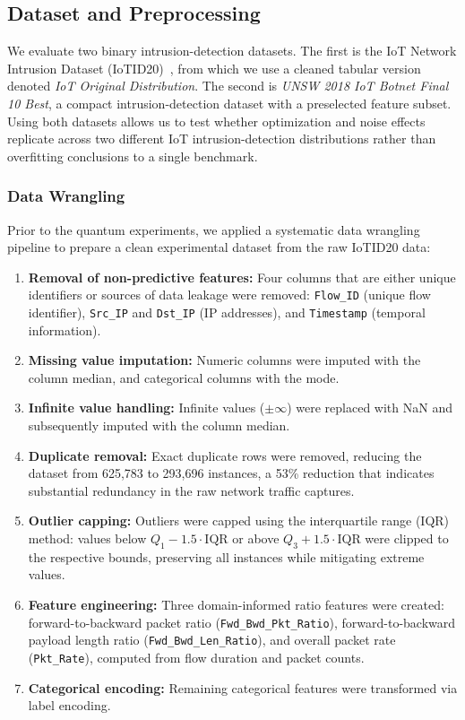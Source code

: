 \documentclass{ieeeaccess}
\begin{document}
\subsection{Dataset and Preprocessing}
\label{sec:dataset}

We evaluate two binary intrusion-detection datasets. The first is the IoT Network Intrusion Dataset (IoTID20)~\cite{ullah2020scheme}, from which we use a cleaned tabular version denoted \emph{IoT Original Distribution}. The second is \emph{UNSW 2018 IoT Botnet Final 10 Best}, a compact intrusion-detection dataset with a preselected feature subset. Using both datasets allows us to test whether optimization and noise effects replicate across two different IoT intrusion-detection distributions rather than overfitting conclusions to a single benchmark.

\subsubsection{Data Wrangling}
Prior to the quantum experiments, we applied a systematic data wrangling pipeline to prepare a clean experimental dataset from the raw IoTID20 data:
\begin{enumerate}
\item \textbf{Removal of non-predictive features:} Four columns that are either unique identifiers or sources of data leakage were removed: \texttt{Flow\_ID} (unique flow identifier), \texttt{Src\_IP} and \texttt{Dst\_IP} (IP addresses), and \texttt{Timestamp} (temporal information).
\item \textbf{Missing value imputation:} Numeric columns were imputed with the column median, and categorical columns with the mode.
\item \textbf{Infinite value handling:} Infinite values ($\pm\infty$) were replaced with NaN and subsequently imputed with the column median.
\item \textbf{Duplicate removal:} Exact duplicate rows were removed, reducing the dataset from 625,783 to 293,696 instances, a 53\% reduction that indicates substantial redundancy in the raw network traffic captures.
\item \textbf{Outlier capping:} Outliers were capped using the interquartile range (IQR) method: values below $Q_1 - 1.5 \cdot \text{IQR}$ or above $Q_3 + 1.5 \cdot \text{IQR}$ were clipped to the respective bounds, preserving all instances while mitigating extreme values.
\item \textbf{Feature engineering:} Three domain-informed ratio features were created: forward-to-backward packet ratio (\texttt{Fwd\_Bwd\_Pkt\_Ratio}), forward-to-backward payload length ratio (\texttt{Fwd\_Bwd\_Len\_Ratio}), and overall packet rate (\texttt{Pkt\_Rate}), computed from flow duration and packet counts.
\item \textbf{Categorical encoding:} Remaining categorical features were transformed via label encoding.
\end{enumerate}
\end{document}
